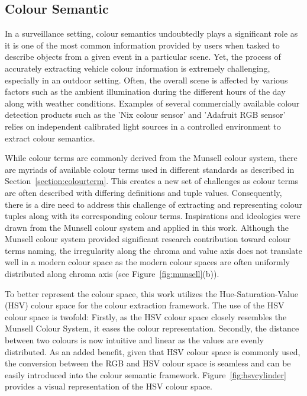 \subsection{Colour Semantic}
\label{subsec:colorsemantics}

In a surveillance setting, colour semantics undoubtedly plays a significant role as it is one of the most common information provided by users when tasked to describe objects from a given event in a particular scene.
Yet, the process of accurately extracting vehicle colour information is extremely challenging, especially in an outdoor setting. Often, the overall scene is affected by various factors such as the ambient illumination during the different hours of the day along with weather conditions.
Examples of several commercially available colour detection products such as the 'Nix colour sensor' \cite{nixsensorltd} and 'Adafruit RGB sensor' \cite{adafruit} relies on independent calibrated light sources in a controlled environment to extract colour semantics.

While colour terms are commonly derived from the Munsell colour system, there are myriads of available colour terms used in different standards as described in Section~\ref{section:colourterm}.
This creates a new set of challenges as colour terms are often described with differing definitions and tuple values.
Consequently, there is a dire need to address this challenge of extracting and representing colour tuples along with its corresponding colour terms.
Inspirations and ideologies were drawn from the Munsell colour system and applied in this work.
Although the Munsell colour system provided significant research contribution toward colour terms naming, the irregularity along the chroma and value axis does not translate well in a modern colour space as the modern colour spaces are often uniformly distributed along chroma axis (see Figure~\ref{fig:munsell}(b)).

To better represent the colour space, this work utilizes the Hue-Saturation-Value (HSV) colour space for the colour extraction framework.
The use of the HSV colour space is twofold: Firstly, as the HSV colour space closely resembles the Munsell Colour System, it eases the colour representation.
Secondly, the distance between two colours is now intuitive and linear as the values are evenly distributed.
As an added benefit, given that HSV colour space is commonly used, the conversion between the RGB and HSV colour space is seamless and can be easily introduced into the colour semantic framework. Figure~\ref{fig:hsvcylinder} provides a visual representation of the HSV colour space.

